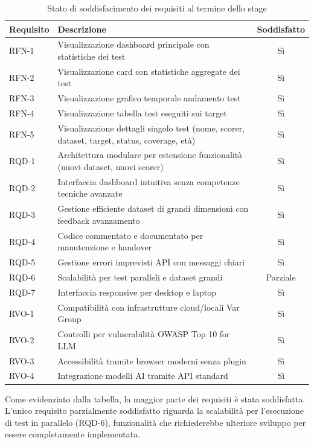 \begin{table}[htbp]
\centering
\caption{Stato di soddisfacimento dei requisiti al termine dello stage}
\label{tab:stato-requisiti}
\begin{tabularx}{\textwidth}{lXc}
\hline\hline
\textbf{Requisito} & \textbf{Descrizione} & \textbf{Soddisfatto}\\
\hline
RFN-1 & Visualizzazione dashboard principale con statistiche dei test & Sì \\
RFN-2 & Visualizzazione card con statistiche aggregate dei test & Sì \\
RFN-3 & Visualizzazione grafico temporale andamento test & Sì \\
RFN-4 & Visualizzazione tabella test eseguiti sui target & Sì \\
RFN-5 & Visualizzazione dettagli singolo test (nome, scorer, dataset, target, status, coverage, età) & Sì \\
\hline
RQD-1 & Architettura modulare per estensione funzionalità (nuovi dataset, nuovi scorer) & Sì \\
RQD-2 & Interfaccia dashboard intuitiva senza competenze tecniche avanzate & Sì \\
RQD-3 & Gestione efficiente dataset di grandi dimensioni con feedback avanzamento & Sì \\
RQD-4 & Codice commentato e documentato per manutenzione e handover & Sì \\
RQD-5 & Gestione errori imprevisti API con messaggi chiari & Sì \\
RQD-6 & Scalabilità per test paralleli e dataset grandi & Parziale \\
RQD-7 & Interfaccia responsive per desktop e laptop & Sì \\
\hline
RVO-1 & Compatibilità con infrastrutture cloud/locali Var Group & Sì \\
RVO-2 & Controlli per vulnerabilità OWASP Top 10 for LLM & Sì \\
RVO-3 & Accessibilità tramite browser moderni senza plugin & Sì \\
RVO-4 & Integrazione modelli AI tramite API standard & Sì \\
\hline\hline
\end{tabularx}
\end{table}

Come evidenziato dalla tabella, la maggior parte dei requisiti è stata soddisfatta. L'unico requisito parzialmente soddisfatto riguarda la scalabilità per l'esecuzione di test in parallelo (RQD-6), funzionalità che richiederebbe ulteriore sviluppo per essere completamente implementata.
\clearpage

